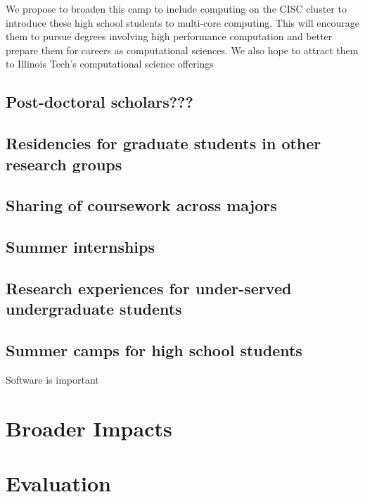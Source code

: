 \documentclass[11pt]{NSFamsart}
\begin{document}
We propose to broaden this camp to include computing on the CISC cluster to introduce these high school students to multi-core computing.  This will encourage them to pursue degrees involving high performance computation and better prepare them for careers as computational sciences.  We also hope to attract them to Illinois Tech's computational science offerings


\subsection{Post-doctoral scholars???} 
\subsection{Residencies for graduate students in other research groups}
\subsection{Sharing of coursework across majors}
\subsection{Summer internships} 
\subsection{Research experiences for under-served undergraduate students}
\subsection{Summer camps for high school students}


Software is important \cite{RudEtal18a}

\section{Broader Impacts}
\section{Evaluation}


\newpage
\clearpage
\setcounter{page}{1}



{\renewcommand\addcontentsline[3]{} 
\renewcommand{\refname}{{\Large\textbf{References Cited}}}                   %
\renewcommand{\bibliofont}{\normalsize}

}
\end{document}
